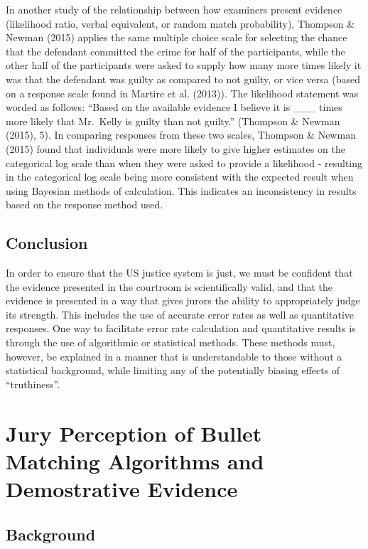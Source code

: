 \documentclass[print]{nuthesis}
\begin{document}
In another study of the relationship between how examiners present evidence (likelihood ratio, verbal equivalent, or random match probability), Thompson \& Newman (2015) applies the same multiple choice scale for selecting the chance that the defendant committed the crime for half of the participants, while the other half of the participants were asked to supply how many more times likely it was that the defendant was guilty as compared to not guilty, or vice versa (based on a response scale found in Martire et al. (2013)).
The likelihood statement was worded as follows: ``Based on the available evidence I believe it is \_\_\_ times more likely that Mr.~Kelly is guilty than not guilty.'' (Thompson \& Newman (2015), 5).
In comparing responses from these two scales, Thompson \& Newman (2015) found that individuals were more likely to give higher estimates on the categorical log scale than when they were asked to provide a likelihood - resulting in the categorical log scale being more consistent with the expected result when using Bayesian methods of calculation.
This indicates an inconsistency in results based on the response method used.

\hypertarget{conclusion}{%
\section{Conclusion}\label{conclusion}}

In order to ensure that the US justice system is just, we must be confident that the evidence presented in the courtroom is scientifically valid, and that the evidence is presented in a way that gives jurors the ability to appropriately judge its strength.
This includes the use of accurate error rates as well as quantitative responses.
One way to facilitate error rate calculation and quantitative results is through the use of algorithmic or statistical methods.
These methods must, however, be explained in a manner that is understandable to those without a statistical background, while limiting any of the potentially biasing effects of ``truthiness''.

\hypertarget{study1}{%
\chapter{Jury Perception of Bullet Matching Algorithms and Demostrative Evidence}\label{study1}}

\hypertarget{background}{%
\section{Background}\label{background}}
\end{document}
